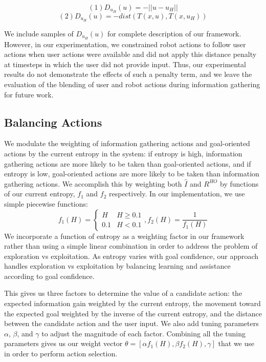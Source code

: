 \documentclass[conference]{IEEEtran}
\begin{document}
\[
(1) D_{u_H}(u) = -||u - u_H||
\]
\[
(2) D_{u_H}(u) = -dist(T(x,u), T(x, u_H))
\]

We include samples of $D_{u_H}(u)$ for complete description of our framework. However, in our experimentation, we constrained robot actions to follow user actions when user actions were available and did not apply this distance penalty at timesteps in which the user did not provide input. Thus, our experimental results do not demonstrate the effects of such a penalty term, and we leave the evaluation of the blending of user and robot actions during information gathering for future work.

\subsection{Balancing Actions}

We modulate the weighting of information gathering actions and goal-oriented actions by the current entropy in the system: if entropy is high, information gathering actions are more likely to be taken than goal-oriented actions, and if entropy is low, goal-oriented actions are more likely to be taken than information gathering actions. We accomplish this by weighting both $\hat{I}$ and $R^{HO}$ by functions of our current entropy, $f_1$ and $f_2$ respectively. In our implementation, we use simple piecewise functions:
\[
f_1(H) =
\begin{cases}
H & H\geq 0.1 \\
0.1 & H < 0.1
\end{cases}
,f_2(H) = \frac{1}{f_1(H)}
\]
We incorporate a function of entropy as a weighting factor in our framework rather than using a simple linear combination in order to address the problem of exploration vs exploitation. As entropy varies with goal confidence, our approach handles exploration vs exploitation by balancing learning and assistance according to goal confidence.

This gives us three factors to determine the value of a candidate action: the expected information gain weighted by the current entropy, the movement toward the expected goal weighted by the inverse of the current entropy, and the distance between the candidate action and the user input. We also add tuning parameters $\alpha$, $\beta$, and $\gamma$ to adjust the magnitude of each factor. Combining all the tuning parameters gives us our weight vector $\theta = [\alpha f_1(H), \beta f_2(H), \gamma]$ that we use in order to perform action selection.
\end{document}
